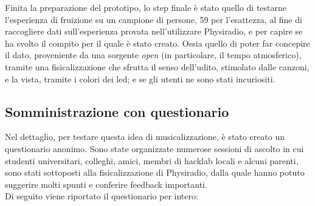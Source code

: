 \documentclass[12pt,a4paper]{report}
\newcommand{\physiradio}{Physiradio} %
\begin{document}
Finita la preparazione del prototipo, lo step finale è stato quello di testarne l'esperienza di fruizione su un campione di persone, 59 per l'esattezza, al fine di raccogliere dati sull'esperienza provata nell'utilizzare \physiradio, e per capire se ha svolto il compito per il quale è stato creato. Ossia quello di poter far concepire il dato, proveniente da una sorgente \textit{open} (in particolare, il tempo atmosferico), tramite una fisicalizzazione che sfrutta il senso dell'udito, stimolato dalle canzoni, e la vista, tramite i colori dei led; e se gli utenti ne sono stati incuriositi.

\subsection{Somministrazione con questionario}

Nel dettaglio, per testare questa idea di musicalizzazione, è stato creato un questionario anonimo.
Sono state organizzate numerose sessioni di ascolto in cui studenti universitari, colleghi, amici, membri di hacklab locali e alcuni parenti, sono stati sottoposti alla fisicalizzazione di \physiradio, dalla quale hanno potuto suggerire molti spunti e conferire feedback importanti.\\
Di seguito viene riportato il questionario per intero:\\
\newpage


\end{document}
